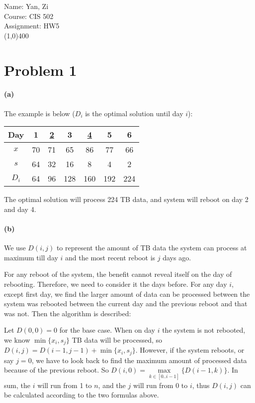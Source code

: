 \documentclass[letter,12pt]{article}
\begin{document}
Name: Yan, Zi \\
Course: CIS 502 \\
Assignment: HW5 \\
\line(1,0){400}

\section*{Problem 1}
\paragraph*{(a)} 
The example is below ($D_i$ is the optimal solution until day $i$):

\begin{tabular}{|c|c|c|c|c|c|c|}
\hline 
Day & 1 & \underline{2} & 3 & \underline{4} & 5 & 6 \\ 
\hline 
$x$ & 70 & 71 & 65 & 86 & 77 & 66 \\ 
\hline 
$s$ & 64 & 32 & 16 & 8 & 4 & 2 \\ 
\hline 
$D_i$ & 64 & 96 & 128 & 160 & 192 & 224 \\ 
\hline 
\end{tabular} 

The optimal solution will process 224 TB data, and system will reboot on day 
2 and day 4.

\paragraph*{(b)}
We use $D(i,j)$ to represent the amount of TB data the system can process at 
maximum till day $i$ and the most recent reboot is $j$ days ago.

For any reboot of the system, the benefit cannot reveal itself on the day of
rebooting. Therefore, we need to consider it the days before. For any 
day $i$, except first day, we find the larger amount of data can be 
processed between the system was rebooted between the current day
and the previous reboot and that was not. Then the algorithm is described:

Let $D(0,0) = 0$ for the base case. When on day $i$ the system is not
rebooted, we know $\min\{x_i, s_j\}$ TB data will be processed, so
$D(i, j) = D(i-1, j-1) + \min\{x_i, s_j\}$. However, if the system reboots,
or say $j=0$, we have to look back to find the maximum amount of 
processed data because of the previous reboot. So $D(i, 0) = 
\max\limits_{k\in[0..i-1]}\{D(i-1,k)\}$. In sum, the $i$ will run from 1 to
$n$, and the $j$ will run from 0 to $i$, thus $D(i, j)$ can be calculated 
according to the two formulas above.
\end{document}
